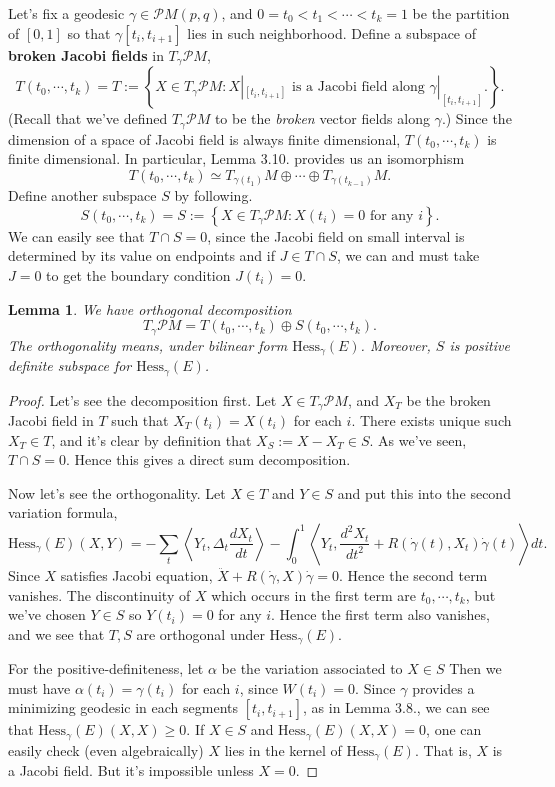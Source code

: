 \documentclass{article}
\newtheorem{lemma}[theorem]{Lemma}
\newcommand{\il}{\langle}
\newcommand{\ir}{\rangle}
\newcommand{\PM}{\mathcal{P}M}
\newcommand{\g}{\gamma}
\newcommand{\Hess}{\mathrm{Hess}}
\begin{document}
Let's fix a geodesic $\g\in \PM(p,q)$, and $0=t_0<t_1<\cdots<t_k=1$ be the partition of $[0,1]$ so that $\g[t_i,t_{i+1}]$ lies in such neighborhood.
Define a subspace of \textbf{broken Jacobi fields} in $T_\g\PM$,
	$$T(t_0,\cdots,t_k)=T:=\left\{X\in T_\g\PM:X|_{[t_i,t_{i+1}]}\text{ is a Jacobi field along }\g|_{[t_i,t_{i+1}]}.\right\}.$$
(Recall that we've defined $T_\g\PM$ to be the \emph{broken} vector fields along $\g$.)
Since the dimension of a space of Jacobi field is always finite dimensional, $T(t_0,\cdots,t_k)$ is finite dimensional.
In particular, Lemma 3.10. provides us an isomorphism
	$$T(t_0,\cdots,t_k)\simeq T_{\g(t_1)}M\oplus\cdots\oplus T_{\g(t_{k-1})}M.$$
Define another subspace $S$ by following.
	$$S(t_0,\cdots,t_k)=S:=\left\{X\in T_\g\PM:X(t_i)=0\text{ for any }i\right\}.$$
We can easily see that $T\cap S=0$, since the Jacobi field on small interval is determined by its value on endpoints and if $J\in T\cap S$, we can and must take $J=0$ to get the boundary condition $J(t_i)=0$.
	\begin{lemma}\rm
	We have orthogonal decomposition
		$$T_\g\PM=T(t_0,\cdots,t_k)\oplus S(t_0,\cdots,t_k).$$
	The orthogonality means, under bilinear form $\Hess_\g(E)$.
	Moreover, $S$ is positive definite subspace for $\Hess_\g(E)$.
	\end{lemma}
		\begin{proof}
		Let's see the decomposition first.
		Let $X\in T_\g\PM$, and $X_T$ be the broken Jacobi field in $T$ such that $X_T(t_i)=X(t_i)$ for each $i$.
		There exists unique such $X_T\in T$, and it's clear by definition that $X_S:=X-X_T\in S$.
		As we've seen, $T\cap S=0$.
		Hence this gives a direct sum decomposition.
		
		Now let's see the orthogonality.
		Let $X\in T$ and $Y\in S$ and put this into the second variation formula,
			$$\Hess_\g(E)(X,Y)=-\sum_t\left\il Y_t,\Delta_t\frac{dX_t}{dt}\right\ir
			-\int_0^1\left\il Y_t,\frac{d^2 X_t}{dt^2}+R(\dot{\g}(t),X_t)\dot{\g}(t)\right\ir dt.$$
		Since $X$ satisfies Jacobi equation, $\ddot{X}+R(\dot{\g},X)\dot{\g}=0$.
		Hence the second term vanishes.
		The discontinuity of $X$ which occurs in the first term are $t_0,\cdots,t_k$, but we've chosen $Y\in S$ so $Y(t_i)=0$ for any $i$.
		Hence the first term also vanishes, and we see that $T,S$ are orthogonal under $\Hess_\g(E)$.
		
		For the positive-definiteness, let $\alpha$ be the variation associated to $X\in S$
		Then we must have $\alpha(t_i)=\g(t_i)$ for each $i$, since $W(t_i)=0$.
		Since $\g$ provides a minimizing geodesic in each segments $[t_i,t_{i+1}]$, as in Lemma 3.8., we can see that $\Hess_\g(E)(X,X)\geq0$.
		If $X\in S$ and $\Hess_\g(E)(X,X)=0$, one can easily check (even algebraically) $X$ lies in the kernel of $\Hess_\g(E)$.
		That is, $X$ is a Jacobi field.
		But it's impossible unless $X=0$.
		\end{proof}
		
\end{document}
